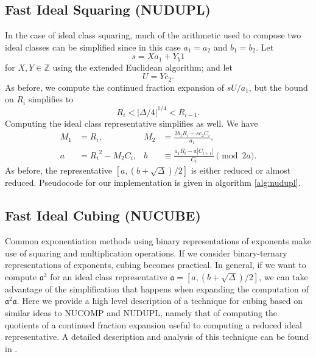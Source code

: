 \documentclass{ucalgthes1}
\theoremstyle{plain}
\theoremstyle{definition}
\newcommand{\ZZ}{\mathbb{Z}}
\begin{document}
\subsection{Fast Ideal Squaring (NUDUPL)}\label{subsec:nudupl}

In the case of ideal class squaring, much of the arithmetic used to compose two ideal classes can be simplified since in this case $a_1=a_2$ and $b_1=b_2$.  Let 
\[
	s = Xa_1 + Y_b1
\]
for $X,Y \in \ZZ$ using the extended Euclidean algorithm; and let 
\[
	U = Yc_2.
\]
As before, we compute the continued fraction expansion of $sU/a_1$, but the bound on $R_i$ simplifies to
\[
	R_i < |\Delta/4|^{1/4} < R_{i-1}.
\]
Computing the ideal class representative simplifies as well.  We have
\begin{align*}
	M_1 &= R_i, & 
	M_2 &= \frac{2b_1R_i - sc_2C_i}{a_1}, \\
	a &= {R_i}^2 - M_2C_i, &
	b &\equiv \frac{a_1 R_i - a |C_{i+1}|}{C_i} \pmod{2a}.
\end{align*}
As before, the representative $[a, (b+\sqrt\Delta)/2]$ is either reduced or almost reduced.  \break Pseudocode for our implementation is given in algorithm \ref{alg:nudupl}.


\subsection{Fast Ideal Cubing (NUCUBE)}\label{subsec:nucube}

Common exponentiation methods using binary representations of exponents make use of squaring and multiplication operations.  If we consider binary-ternary representations of exponents, cubing becomes practical.  In general, if we want to compute ${\mathfrak a}^3$ for an ideal class representative $\mathfrak a = [a, (b+\sqrt\Delta)/2]$, we can take advantage of the simplification that happens when expanding the computation of ${\mathfrak a}^2 \mathfrak a$.  Here we provide a high level description of a technique for cubing based on similar ideas to NUCOMP and NUDUPL, namely that of computing the quotients of a continued fraction expansion useful to computing a reduced ideal representative.  A detailed description and analysis of this technique can be found in \cite{Ijs2010}.
\end{document}
